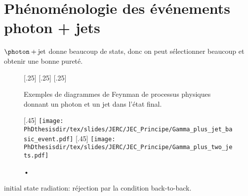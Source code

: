 \section{Phénoménologie des événements photon + jets}\label{chapter-JERC-section-pheno-GJets}
$\photon+\text{jet}$ donne beaucoup de stats, donc on peut sélectionner beaucoup et obtenir une bonne pureté.
\begin{figure}[h]
\centering\vspace{\baselineskip}
\subcaptionbox{\label{subfig-fgraph-gq_qGamma_S}}[.25\textwidth]
{}
\qquad
\subcaptionbox{\label{subfig-fgraph-gq_qGamma_T}}[.25\textwidth]
{}
\qquad
\subcaptionbox{\label{subfig-fgraph-qq_gGamma}}[.25\textwidth]
{}
\caption{Exemples de diagrammes de Feynman de processus physiques donnant un photon et un jet dans l'état final.}
\label{fig-fgraph-gamma_plus_jets}
\end{figure}

\begin{figure}[h]
\centering
\subcaptionbox{\label{subfig-Gamma_plus_jet_basic_event}}[.45\textwidth]
{\texttt{[image: \\PhDthesisdir/tex/slides/JERC/JEC\_Principe/Gamma\_plus\_jet\_basic\_event.pdf]}}
\qquad
\subcaptionbox{\label{subfig-Gamma_plus_two_jets}}[.45\textwidth]
{\texttt{[image: \\PhDthesisdir/tex/slides/JERC/JEC\_Principe/Gamma\_plus\_two\_jets.pdf]}}
\caption{•}
\label{fig-Gamma_plus_jet_events}
\end{figure}

initial state radiation: réjection par la condition back-to-back.
